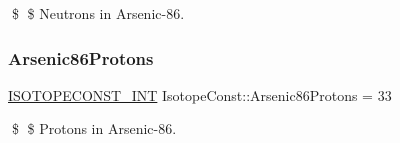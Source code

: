 \$ \$ Neutrons in Arsenic-\/86. \mbox{\label{group___isotope_const-_arsenic-_as86_gad1b0441b1de1f26724ad36bb4153f8bc}} 
\subsubsection{\texorpdfstring{Arsenic86\+Protons}{Arsenic86Protons}}
{\footnotesize\ttfamily \mbox{\hyperlink{group___isotope_const-_macros_ga5f18360b3e99483a35c32d789e62621c}{I\+S\+O\+T\+O\+P\+E\+C\+O\+N\+S\+T\+\_\+\+I\+NT}} Isotope\+Const\+::\+Arsenic86\+Protons = 33}

\$ \$ Protons in Arsenic-\/86. 